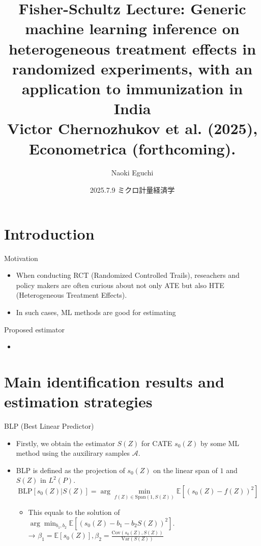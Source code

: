 \documentclass[xcolor=svgnames,aspectratio=169]{beamer}
\newcommand{\E}{\mathbb{E}}
\newcommand{\cov}{\text{Cov}}
\newcommand{\var}{\text{Var}}
\begin{document}
 

\title{Fisher-Schultz Lecture: Generic machine learning inference on heterogeneous treatment effects in randomized experiments, with an application to immunization in India \\ \small{Victor Chernozhukov et al. (2025), Econometrica (forthcoming).}}
\author{Naoki Eguchi}          
\date{2025.7.9 ミクロ計量経済学}

\begin{frame}                  
    \titlepage                     
\end{frame}

\section{Introduction}

\begin{frame}{Motivation}
    \begin{itemize}
        \item When conducting RCT (Randomized Controlled Trails), reseachers and policy makers are often curious about not only ATE but also HTE (Heterogeneous Treatment Effects).
        \item In such cases, ML methods are good for estimating
    \end{itemize}
\end{frame}

\begin{frame}{Proposed estimator}
    \begin{itemize}
        \item 
    \end{itemize}
\end{frame}

\section{Main identification results and estimation strategies}

\begin{frame}{BLP (Best Linear Predictor)}
    \begin{itemize}
        \item Firstly, we obtain the estimator $S(Z)$ for CATE $s_0(Z)$ by some ML method using the auxilirary samples $\mathcal{A} $.
        \item BLP is defined as the projection of $s_0(Z)$ on the linear span of $1$ and $S(Z)$ in $L^2(P)$.
        \[
        \text{BLP}[s_0(Z)|S(Z)]=\arg\min_{f(Z)\in \text{Span}(1,S(Z))}\E[(s_0(Z)-f(Z))^2]
        \]
        \begin{itemize}
            \item This equals to the solution of $\arg\min_{b_1,b_2}\E[(s_0(Z)-b_1-b_2 S(Z))^2]$. \\
            → $\beta_1=\E[s_0(Z)], \beta_2=\frac{\cov(s_0(Z),S(Z))}{\var(S(Z))}$
        \end{itemize}

    \end{itemize}
\end{frame}
\end{document}
